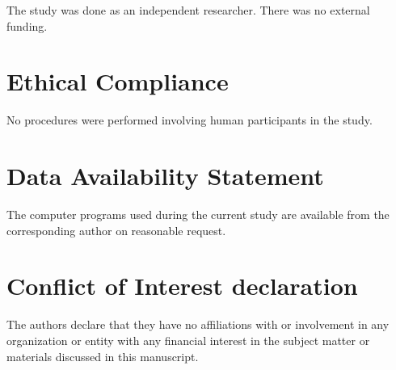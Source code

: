 \documentclass[twoside]{article}
\begin{document}
 The study was done as an independent researcher. There was no
external funding.

\section*{Ethical Compliance}

 No procedures were performed  involving human participants in the study.

\section*{Data Availability Statement}

The computer programs used during the current study are
available from the corresponding author on reasonable request.

\section*{Conflict of Interest declaration} 

The authors declare that they have no affiliations with or involvement in any organization 
or entity with any financial interest in the subject matter or materials discussed 
in this manuscript.
\end{document}
